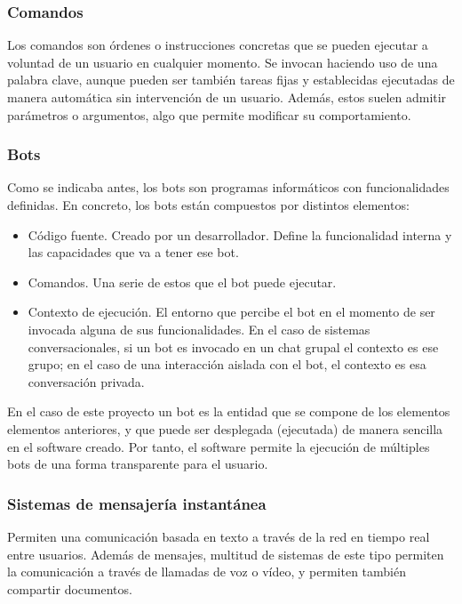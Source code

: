 \subsubsection{Comandos}

Los comandos son órdenes o instrucciones concretas que se pueden ejecutar a voluntad de un usuario en cualquier momento. Se invocan haciendo uso de una palabra clave, aunque pueden ser también tareas fijas y establecidas ejecutadas de manera automática sin intervención de un usuario. Además, estos suelen admitir parámetros o argumentos, algo que permite modificar su comportamiento.

\subsubsection{Bots}

Como se indicaba antes, los bots son programas informáticos con funcionalidades definidas. En concreto, los bots están compuestos por distintos elementos:

\begin{itemize}
	\item Código fuente. Creado por un desarrollador. Define la funcionalidad interna y las capacidades que va a tener ese bot.
	\item Comandos. Una serie de estos que el bot puede ejecutar.
	\item Contexto de ejecución. El entorno que percibe el bot en el momento de ser invocada alguna de sus funcionalidades. En el caso de sistemas conversacionales, si un bot es invocado en un chat grupal el contexto es ese grupo; en el caso de una interacción aislada con el bot, el contexto es esa conversación privada.
\end{itemize}

En el caso de este proyecto un bot es la entidad que se compone de los elementos elementos anteriores, y que puede ser desplegada (ejecutada) de manera sencilla en el software creado. Por tanto, el software permite la ejecución de múltiples bots de una forma transparente para el usuario.

\subsubsection{Sistemas de mensajería instantánea}

Permiten una comunicación basada en texto a través de la red en tiempo real entre usuarios. Además de mensajes, multitud de sistemas de este tipo permiten la comunicación a través de llamadas de voz o vídeo, y permiten también compartir documentos.

